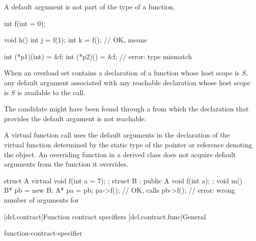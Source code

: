 A default argument is not part of the
type of a function.
\begin{example}
\begin{codeblock}
int f(int = 0);

void h() {
  int j = f(1);
  int k = f();                      // OK, means 
}

int (*p1)(int) = &f;
int (*p2)() = &f;                   // error: type mismatch
\end{codeblock}
\end{example}
\begin{note}
When an overload set contains a declaration of a function
whose host scope is $S$,
any default argument associated with any reachable declaration
whose host scope is $S$
is available to the call.
\end{note}
\begin{note}
The candidate might have been found through a 
from which the declaration that provides the default argument is not reachable.
\end{note}

\pnum
{}%
A virtual function call uses the default
arguments in the declaration of the virtual function determined
by the static type of the pointer or reference denoting the
object.
An overriding function in a derived class does not
acquire default arguments from the function it overrides.
\begin{example}
\begin{codeblock}
struct A {
  virtual void f(int a = 7);
};
struct B : public A {
  void f(int a);
};
void m() {
  B* pb = new B;
  A* pa = pb;
  pa->f();          // OK, calls 
  pb->f();          // error: wrong number of arguments for 
}
\end{codeblock}
\end{example}
%

[dcl.contract]{Function contract specifiers}
[dcl.contract.func]{General}

%

\begin{bnf}
\br
    function-contract-specifier 
\end{bnf}

